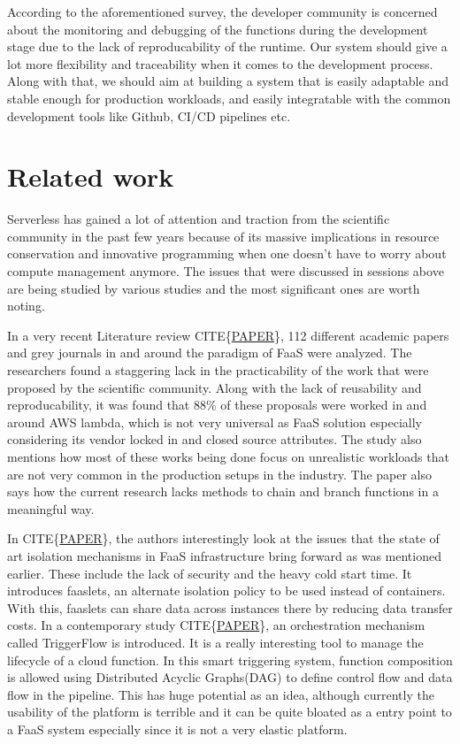 \documentclass[12pt,titlepage]{article}
\begin{document}
According to the aforementioned survey, the developer community is concerned
about the monitoring and debugging of the functions during the development stage
due to the lack of reproducability of the runtime. Our system should give a lot
more flexibility and traceability when it comes to the development process.
Along with that, we should aim at building a system that is easily adaptable and
stable enough for production workloads, and easily integratable with the common
development tools like Github, CI/CD pipelines etc.

\section{Related work}
\label{sec:org2190a1b}
Serverless has gained a lot of attention and traction from the scientific
community in the past few years because of its massive implications in resource
conservation and innovative programming when one doesn't have to worry about
compute management anymore. The issues that were discussed in sessions above are
being studied by various studies and the most significant ones are worth noting.

In a very recent Literature review CITE\{\href{https://arxiv.org/pdf/2004.03276.pdf}{PAPER}\}, 112 different academic papers
and grey journals in
and around the paradigm of FaaS were analyzed. The researchers found a
staggering lack in the practicability of the work that were proposed by the
scientific community. Along with the lack of reusability and reproducability, it
was found that 88\% of these proposals were worked in and around AWS lambda,
which is not very universal as FaaS solution especially considering its vendor
locked in and closed source attributes. The study also mentions how most of
these works being done focus on unrealistic workloads that are not very common
in the production setups in the industry. The paper also says how the current
research lacks methods to chain and branch functions in a meaningful way.

In CITE\{\href{https://arxiv.org/abs/2002.09344}{PAPER}\}, the authors interestingly look at the issues that the state of art
isolation mechanisms in FaaS infrastructure bring forward as was mentioned
earlier. These include the lack of security and the heavy cold start time. It
introduces faaslets, an alternate isolation policy to be used instead of
containers. With this, faaslets can share data across instances there by
reducing data transfer costs. In a contemporary study CITE\{\href{https://arxiv.org/pdf/2006.08654.pdf}{PAPER}\}, an
orchestration mechanism called TriggerFlow is introduced. It is a really
interesting tool to manage the lifecycle of a cloud function. In this smart
triggering system, function composition is allowed using Distributed Acyclic
Graphs(DAG) to define control flow and data flow in the pipeline. This has huge
potential as an idea, although currently the usability of the platform is
terrible and it can be quite bloated as a entry point to a FaaS system
especially since it is not a very elastic platform.
\end{document}
